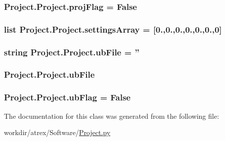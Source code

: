 \hypertarget{class_project_1_1_project_a24e1a52b21994951813562a80bfcdcad}{
\subsubsection[{proj\-Flag}]{\setlength{\rightskip}{0pt plus 5cm}Project.\-Project.\-proj\-Flag = False\hspace{0.3cm}{\ttfamily [static]}}}\label{class_project_1_1_project_a24e1a52b21994951813562a80bfcdcad}
\hypertarget{class_project_1_1_project_a0d645f784cc44f878dc6bbaf86579517}{
\subsubsection[{settings\-Array}]{\setlength{\rightskip}{0pt plus 5cm}list Project.\-Project.\-settings\-Array = \mbox{[}0.,0.,0.,0.,0.,0.,0\mbox{]}\hspace{0.3cm}{\ttfamily [static]}}}\label{class_project_1_1_project_a0d645f784cc44f878dc6bbaf86579517}
\hypertarget{class_project_1_1_project_add56cb764f050d4cbd41564b5de6bdf0}{
\subsubsection[{ub\-File}]{\setlength{\rightskip}{0pt plus 5cm}string Project.\-Project.\-ub\-File = ''\hspace{0.3cm}{\ttfamily [static]}}}\label{class_project_1_1_project_add56cb764f050d4cbd41564b5de6bdf0}
\hypertarget{class_project_1_1_project_a8eae8faddab323b07537ca6a5f3916cc}{
\subsubsection[{ub\-File}]{\setlength{\rightskip}{0pt plus 5cm}Project.\-Project.\-ub\-File}}\label{class_project_1_1_project_a8eae8faddab323b07537ca6a5f3916cc}
\hypertarget{class_project_1_1_project_ad80180beff6260cee514b29e80083d55}{
\subsubsection[{ub\-Flag}]{\setlength{\rightskip}{0pt plus 5cm}Project.\-Project.\-ub\-Flag = False\hspace{0.3cm}{\ttfamily [static]}}}\label{class_project_1_1_project_ad80180beff6260cee514b29e80083d55}


The documentation for this class was generated from the following file\-:\begin{DoxyCompactItemize}
\item 
workdir/atrex/\-Software/\hyperlink{_project_8py}{Project.\-py}\end{DoxyCompactItemize}
